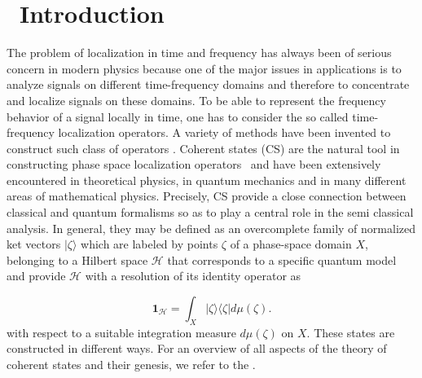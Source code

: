 
     



























\section{\ \textbf{Introduction}}

The problem of localization in time and frequency has always been of serious
concern in modern physics because one of the major issues in applications is
to analyze signals on different time-frequency domains and therefore to
concentrate and localize signals on these domains. To be able to represent
the frequency behavior of a signal locally in time, one has to consider the
so called time-frequency localization operators. A variety of methods have
been invented to construct such class of operators \cite{W}.
Coherent states (CS) are the natural tool in constructing phase space
localization operators \ and have been extensively encountered in
theoretical physics, in quantum mechanics and in many different areas of
mathematical physics. Precisely, CS provide a close connection between
classical and quantum formalisms so as to play a central role in the semi
classical analysis. In general, they may be defined as an overcomplete
family of normalized ket vectors $|\zeta \rangle $ which are labeled by
points $\zeta $ of a phase-space domain $X$, belonging to a Hilbert space $%
\mathcal{H}$ that corresponds to a specific quantum model and provide $%
\mathcal{H}$ with a resolution of its identity operator as


\begin{equation}
\label{r1}
\mathbf{1}_{\mathcal{H}}=\int_{X}|\zeta \rangle \langle \zeta |d\mu (\zeta ).
\end{equation}
with respect to a suitable integration measure $d\mu (\zeta )$ on $X$. These
states are constructed in different ways. For an overview of all aspects of
the theory of coherent states and their genesis, we refer to the \cite{V,TP}.

